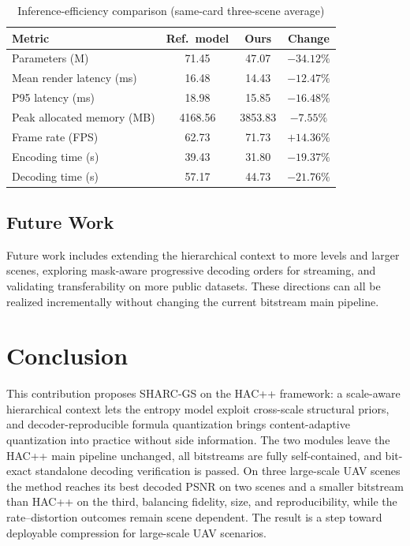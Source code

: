 \documentclass[conference]{IEEEtran}
\begin{document}
\begin{table}[t]
\caption{Inference-efficiency comparison (same-card three-scene average)}
\centering
\footnotesize
\begin{tabular}{@{}l c c c@{}}
\toprule
\textbf{Metric} & \textbf{Ref.\ model} & \textbf{Ours} &
\textbf{Change} \\
\midrule
Parameters (M) & 71.45 & 47.07 & $-34.12\%$ \\
Mean render latency (ms) & 16.48 & 14.43 & $-12.47\%$ \\
P95 latency (ms) & 18.98 & 15.85 & $-16.48\%$ \\
Peak allocated memory (MB) & 4168.56 & 3853.83 & $-7.55\%$ \\
Frame rate (FPS) & 62.73 & 71.73 & $+14.36\%$ \\
Encoding time (s) & 39.43 & 31.80 & $-19.37\%$ \\
Decoding time (s) & 57.17 & 44.73 & $-21.76\%$ \\
\bottomrule
\end{tabular}
\label{tab:efficiency}
\end{table}

\subsection{Future Work}
Future work includes extending the hierarchical context to more levels
and larger scenes, exploring mask-aware progressive decoding orders for
streaming, and validating transferability on more public datasets. These
directions can all be realized incrementally without changing the
current bitstream main pipeline.

\section{Conclusion}
This contribution proposes SHARC-GS on the HAC++ framework: a
scale-aware hierarchical context lets the entropy model exploit
cross-scale structural priors, and decoder-reproducible formula
quantization brings content-adaptive quantization into practice without
side information. The two modules leave the HAC++ main pipeline
unchanged, all bitstreams are fully self-contained, and bit-exact
standalone decoding verification is passed. On three large-scale UAV
scenes the method reaches its best decoded PSNR on two scenes and a smaller
bitstream than HAC++ on the third, balancing fidelity, size, and
reproducibility, while the rate--distortion outcomes remain scene
dependent. The result is a step toward deployable compression for
large-scale UAV scenarios.
\end{document}
